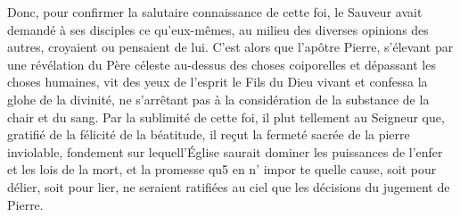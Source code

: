 Donc, pour confirmer la salutaire connaissance de cette foi, le Sauveur avait demandé à ses disciples ce qu’eux-mêmes, au milieu des diverses opinions des autres, croyaient ou pensaient de lui. C’est alors que l’apôtre Pierre, s’élevant par une révélation du Père céleste au-dessus des choses coiporelles et dépassant les choses humaines, vit des yeux de l’esprit le Fils du Dieu vivant et confessa la glohe de la divinité, ne s’arrêtant pas à la considération de la substance de la chair et du sang. Par la sublimité de cette foi, il plut tellement au Seigneur que, gratifié de la félicité de la béatitude, il reçut la fermeté sacrée de la pierre inviolable, fondement sur lequell’Église saurait dominer les puissances de l’enfer et les lois de la mort, et la promesse qu5 en n’ impor te quelle cause, soit pour délier, soit pour lier, ne seraient ratifiées au ciel que les décisions du jugement de Pierre.
